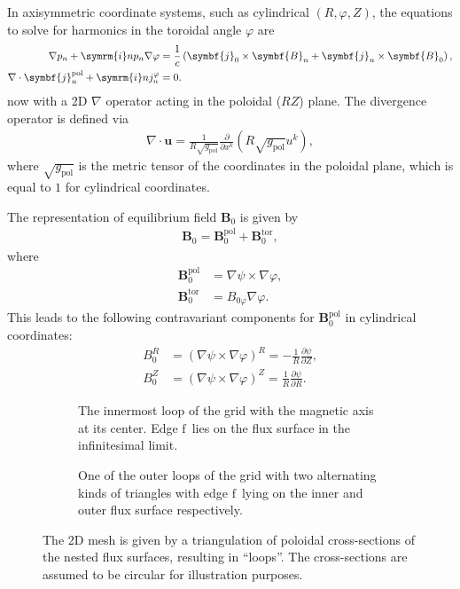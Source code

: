 \documentclass[a4paper, 10pt, english]{article}
\let\temp\vartheta
\let\vartheta\theta
\let\theta\temp
\let\temp\varphi
\let\varphi\phi
\let\phi\temp
\let\vec\symbf
\newcommand*\im{\ensuremath{\symrm{i}}}  %
\newcommand*\pd[2][]{\ensuremath{\frac{\partial #1}{\partial #2}}}  %
\newcommand*\pol{\ensuremath{\textrm{pol}}}  %
\newcommand*\tor{\ensuremath{\textrm{tor}}}  %
\newcommand*\fs{\ensuremath{\textrm{f}}}  %
\begin{document}
In axisymmetric coordinate systems, such as cylindrical $(R, \phi, Z)$, the equations to solve for harmonics in the toroidal angle $\phi$ are
\begin{align}
  \nabla p_{n} + \im n p_{n} \nabla \phi &= \frac{1}{c} \left( \vec{j}_{0} \times \vec{B}_{n} + \vec{j}_{n} \times \vec{B}_{0} \right), \label{eq:mhd-2} \\
  \nabla \cdot \vec{j}_{n}^{\pol}+ \im n j_{n}^{\phi} &= 0. \label{eq:divfree-2}
\end{align}
now with a 2D $\nabla$ operator acting in the poloidal ($RZ$) plane. The divergence operator is defined via
\begin{gather*}
  \nabla \cdot \vec{u} = \frac{1}{R \sqrt{g_{\pol}}} \pd{x^{k}} (R \sqrt{g_{\pol}} u^{k}),
\end{gather*}
where $\sqrt{g_{\pol}}$ is the metric tensor of the coordinates in the poloidal plane, which is equal to $1$ for cylindrical coordinates.

The representation of equilibrium field $\vec{B}_{0}$ is given by
\begin{gather}
  \vec{B}_{0} = \vec{B}_{0}^{\pol} + \vec{B}_{0}^{\tor},
\end{gather}
where 
\begin{align}
  \vec{B}_{0}^{\pol} &= \nabla \psi \times \nabla \phi, \\
  \vec{B}_{0}^{\tor} &= B_{0 \phi} \nabla \phi.
\end{align}
This leads to the following contravariant components for $\vec{B}_{0}^{\pol}$ in cylindrical coordinates:
\begin{align}
  B_{0}^{R} &= (\nabla \psi \times \nabla \phi)^{R} = -\frac{1}{R} \pd[\psi]{Z}, \\
  B_{0}^{Z} &= (\nabla \psi \times \nabla \phi)^{Z} = \frac{1}{R} \pd[\psi]{R}.
\end{align}

\begin{figure}
  \centering
  \begin{subfigure}[b]{0.33\textwidth}
    \centering
    
    \caption{The innermost loop of the grid with the magnetic axis at its center. Edge \fs\ lies on the flux surface in the infinitesimal limit.}
    \label{fig:grid0}
  \end{subfigure}
  \quad
  \begin{subfigure}[b]{0.5\textwidth}
    \centering
    
    \caption{One of the outer loops of the grid with two alternating kinds of triangles with edge \fs\ lying on the inner and outer flux surface respectively.}
    \label{fig:grid1}
  \end{subfigure}
  \caption{The 2D mesh is given by a triangulation of poloidal cross-sections of the nested flux surfaces, resulting in \enquote{loops}. The cross-sections are assumed to be circular for illustration purposes.}
  \label{fig:grid}
\end{figure}
\end{document}
